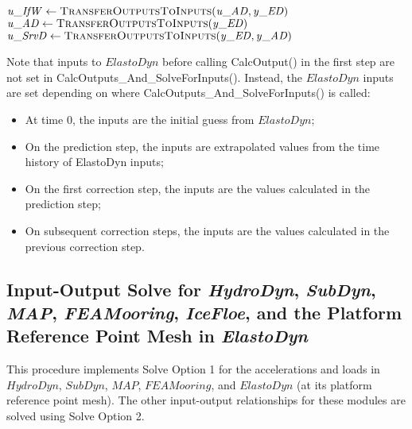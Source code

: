 \documentclass[10pt,letterpaper,oneside,notitlepage]{article}
\begin{document}
\begin{algorithmic}[1]
\State
\State {}
\State
   \State $\mathit{u\_IfW}  \gets \Call{TransferOutputsToInputs}{\mathit{u\_AD},\mathit{y\_ED}}$
   \State $\mathit{u\_AD}   \gets \Call{TransferOutputsToInputs}{\mathit{y\_ED}}$
   \State $\mathit{u\_SrvD} \gets \Call{TransferOutputsToInputs}{\mathit{y\_ED},\mathit{y\_AD}}$

\EndProcedure
\end{algorithmic}

Note that inputs to $ElastoDyn$ before calling CalcOutput() in the first step are not set in CalcOutputs\_And\_SolveForInputs(). 
Instead, the $ElastoDyn$ inputs are set depending on where CalcOutputs\_And\_SolveForInputs() is called:
\begin{itemize}[noitemsep] %
   \item At time 0, the inputs are the initial guess from $ElastoDyn$;
   \item On the prediction step, the inputs are extrapolated values from the time history of ElastoDyn inputs;
   \item On the first correction step, the inputs are the values calculated in the prediction step;
   \item On subsequent correction steps, the inputs are the values calculated in the previous correction step.
\end{itemize}


\subsection {Input-Output Solve for \textit{HydroDyn}, \textit{SubDyn}, \textit{MAP}, 
       \textit{FEAMooring}, \textit{IceFloe}, and the Platform Reference Point Mesh in \textit{ElastoDyn}}

This procedure implements Solve Option 1 for the accelerations and loads in
$HydroDyn$, $SubDyn$, $MAP$, $FEAMooring$, and $ElastoDyn$ (at its platform reference point mesh). 
The other input-output relationships for these modules are solved using Solve Option 2.
\end{document}
